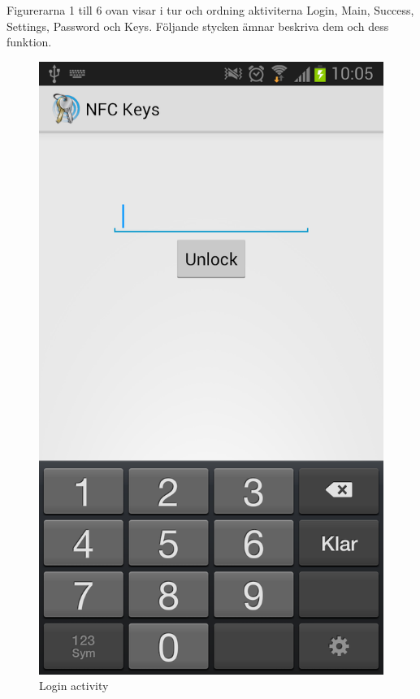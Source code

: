 \documentclass[11pt]{article}
\begin{document}

Figurerarna 1 till 6 ovan visar i tur och ordning aktiviterna Login, Main, Success, Settings, Password och Keys.
Följande stycken ämnar beskriva dem och dess funktion.

\begin{figure}[H]
\centering
\includegraphics[scale=0.2]{app_login.png}
\caption{Login activity}
\label{fig:App_login}
\end{figure}
\end{document}
